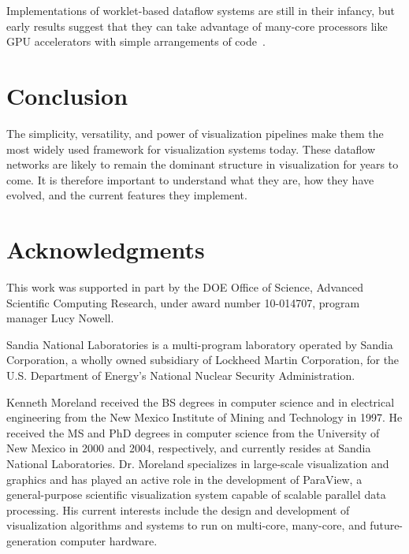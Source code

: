 \documentclass[journal,onecolumn,12pt,letterpaper,twoside]{IEEEtran}
\newcommand*{\lcite}[1]{~\cite{#1}}
\begin{document}
Implementations of worklet-based dataflow systems are still in their
infancy, but early results suggest that they can take advantage of
many-core processors like GPU accelerators with simple arrangements of
code\lcite{Moreland2011:LDAV}.


\section{Conclusion}
\label{sec:Conclusion}

The simplicity, versatility, and power of visualization pipelines make them
the most widely used framework for visualization systems today.  These
dataflow networks are likely to remain the dominant structure in
visualization for years to come.  It is therefore important to understand
what they are, how they have evolved, and the current features they
implement.


\section*{Acknowledgments}

This work was supported in part by the DOE Office of Science, Advanced
Scientific Computing Research, under award number 10-014707, program
manager Lucy Nowell.

Sandia National Laboratories is a multi-program laboratory operated by
Sandia Corporation, a wholly owned subsidiary of Lockheed Martin
Corporation, for the U.S. Department of Energy's National Nuclear Security
Administration.




\begin{biography}{Kenneth Moreland}
  received the BS degrees in computer science and in electrical engineering
  from the New Mexico Institute of Mining and Technology in 1997.  He
  received the MS and PhD degrees in computer science from the University
  of New Mexico in 2000 and 2004, respectively, and currently resides at
  Sandia National Laboratories.  Dr. Moreland specializes in large-scale
  visualization and graphics and has played an active role in the
  development of ParaView, a general-purpose scientific visualization
  system capable of scalable parallel data processing.  His current
  interests include the design and development of visualization algorithms
  and systems to run on multi-core, many-core, and future-generation
  computer hardware.
\end{biography}
\end{document}
